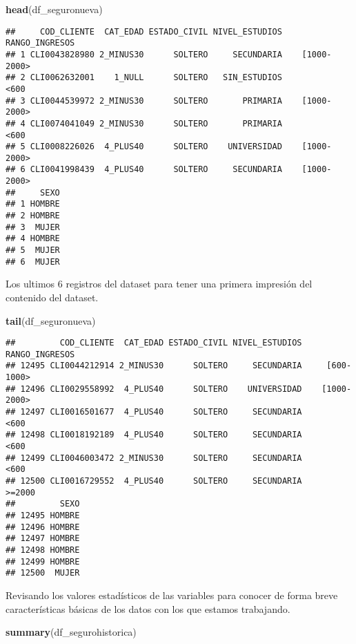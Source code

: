 \documentclass[]{article}
\newenvironment{Shaded}{\begin{snugshade}}{\end{snugshade}}
\newcommand{\KeywordTok}[1]{\textcolor[rgb]{0.13,0.29,0.53}{\textbf{#1}}}
\newcommand{\NormalTok}[1]{#1}
\begin{document}
\begin{Shaded}
\begin{Highlighting}[]
\KeywordTok{head}\NormalTok{(df_seguronueva)}
\end{Highlighting}
\end{Shaded}

\begin{verbatim}
##     COD_CLIENTE  CAT_EDAD ESTADO_CIVIL NIVEL_ESTUDIOS RANGO_INGRESOS
## 1 CLI0043828980 2_MINUS30      SOLTERO     SECUNDARIA    [1000-2000>
## 2 CLI0062632001    1_NULL      SOLTERO   SIN_ESTUDIOS           <600
## 3 CLI0044539972 2_MINUS30      SOLTERO       PRIMARIA    [1000-2000>
## 4 CLI0074041049 2_MINUS30      SOLTERO       PRIMARIA           <600
## 5 CLI0008226026  4_PLUS40      SOLTERO    UNIVERSIDAD    [1000-2000>
## 6 CLI0041998439  4_PLUS40      SOLTERO     SECUNDARIA    [1000-2000>
##     SEXO
## 1 HOMBRE
## 2 HOMBRE
## 3  MUJER
## 4 HOMBRE
## 5  MUJER
## 6  MUJER
\end{verbatim}

Los ultimos 6 registros del dataset para tener una primera impresión del
contenido del dataset.

\begin{Shaded}
\begin{Highlighting}[]
\KeywordTok{tail}\NormalTok{(df_seguronueva)}
\end{Highlighting}
\end{Shaded}

\begin{verbatim}
##         COD_CLIENTE  CAT_EDAD ESTADO_CIVIL NIVEL_ESTUDIOS RANGO_INGRESOS
## 12495 CLI0044212914 2_MINUS30      SOLTERO     SECUNDARIA     [600-1000>
## 12496 CLI0029558992  4_PLUS40      SOLTERO    UNIVERSIDAD    [1000-2000>
## 12497 CLI0016501677  4_PLUS40      SOLTERO     SECUNDARIA           <600
## 12498 CLI0018192189  4_PLUS40      SOLTERO     SECUNDARIA           <600
## 12499 CLI0046003472 2_MINUS30      SOLTERO     SECUNDARIA           <600
## 12500 CLI0016729552  4_PLUS40      SOLTERO     SECUNDARIA         >=2000
##         SEXO
## 12495 HOMBRE
## 12496 HOMBRE
## 12497 HOMBRE
## 12498 HOMBRE
## 12499 HOMBRE
## 12500  MUJER
\end{verbatim}

Revisando los valores estadísticos de las variables para conocer de
forma breve características básicas de los datos con los que estamos
trabajando.

\begin{Shaded}
\begin{Highlighting}[]
\KeywordTok{summary}\NormalTok{(df_segurohistorica)}
\end{Highlighting}
\end{Shaded}
\end{document}
